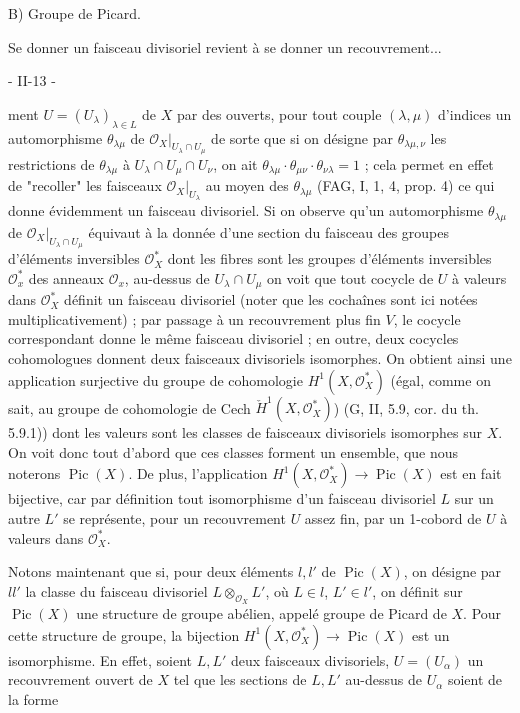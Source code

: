 B) Groupe de Picard.

Se donner un faisceau divisoriel revient à se donner un recouvrement...

\newpage


- II-13 -

ment $U = (U_\lambda)_{\lambda \in L}$ de $X$ par des ouverts, pour tout couple $(\lambda, \mu)$ d'indices un automorphisme $\theta_{\lambda\mu}$ de $\mathcal{O}_X|_{U_\lambda \cap U_\mu}$ de sorte que si on désigne par $\theta_{\lambda\mu, \nu}$ les restrictions de $\theta_{\lambda\mu}$ à $U_\lambda \cap U_\mu \cap U_\nu$, on ait $\theta_{\lambda\mu} \cdot \theta_{\mu\nu} \cdot \theta_{\nu\lambda} = 1$ ; cela permet en effet de "recoller" les faisceaux $\mathcal{O}_X|_{U_\lambda}$ au moyen des $\theta_{\lambda\mu}$ (FAG, I, 1, 4, prop. 4) ce qui donne évidemment un faisceau divisoriel. Si on observe qu'un automorphisme $\theta_{\lambda\mu}$ de $\mathcal{O}_X|_{U_\lambda \cap U_\mu}$ équivaut à la donnée d'une section du faisceau des groupes d'éléments inversibles $\mathcal{O}_X^*$ dont les fibres sont les groupes d'éléments inversibles $\mathcal{O}_x^*$ des anneaux $\mathcal{O}_x$, au-dessus de $U_\lambda \cap U_\mu$ on voit que tout cocycle de $U$ à valeurs dans $\mathcal{O}_X^*$ définit un faisceau divisoriel (noter que les cochaînes sont ici notées multiplicativement) ; par passage à un recouvrement plus fin $V$, le cocycle correspondant donne le même faisceau divisoriel ; en outre, deux cocycles cohomologues donnent deux faisceaux divisoriels isomorphes. On obtient ainsi une application surjective du groupe de cohomologie $H^1(X, \mathcal{O}_X^*)$ (égal, comme on sait, au groupe de cohomologie de Cech $\check{H}^1(X, \mathcal{O}_X^*)$) (G, II, 5.9, cor. du th. 5.9.1)) dont les valeurs sont les classes de faisceaux divisoriels isomorphes sur $X$. On voit donc tout d'abord que ces classes forment un ensemble, que nous noterons $\operatorname{Pic}(X)$. De plus, l'application $H^1(X, \mathcal{O}_X^*) \to \operatorname{Pic}(X)$ est en fait bijective, car par définition tout isomorphisme d'un faisceau divisoriel $L$ sur un autre $L'$ se représente, pour un recouvrement $U$ assez fin, par un 1-cobord de $U$ à valeurs dans $\mathcal{O}_X^*$.

Notons maintenant que si, pour deux éléments $l, l'$ de $\operatorname{Pic}(X)$, on désigne par $ll'$ la classe du faisceau divisoriel $L \otimes_{\mathcal{O}_X} L'$, où $L \in l$, $L' \in l'$, on définit sur $\operatorname{Pic}(X)$ une structure de groupe abélien, appelé groupe de Picard de $X$. Pour cette structure de groupe, la bijection $H^1(X, \mathcal{O}_X^*) \to \operatorname{Pic}(X)$ est un isomorphisme. En effet, soient $L, L'$ deux faisceaux divisoriels, $U = (U_\alpha)$ un recouvrement ouvert de $X$ tel que les sections de $L, L'$ au-dessus de $U_\alpha$ soient de la forme

